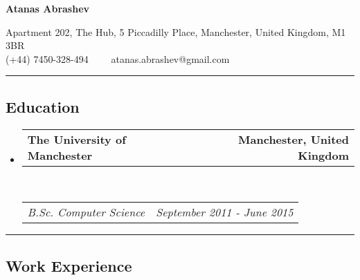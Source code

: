 \documentclass[10pt,letterpaper]{article}
\makeatletter
\newcommand{\headerrow}[2]
{\begin{tabular*}{\linewidth}{l@{\extracolsep{\fill}}r}
    #1 &
    #2 \\
\end{tabular*}}
\makeatother
\begin{document}
\begin{center}
{\LARGE \textbf{Atanas Abrashev}}

Apartment 202, The Hub,
5 Piccadilly Place,
Manchester, United Kingdom,
M1 3BR
\\
(+44) 7450-328-494\ \ \textbullet
\ \ atanas.abrashev@gmail.com
\end{center}

\hrule
\vspace{-0.4em}
\subsection*{Education}

\begin{itemize}
    \parskip=0.1em

    \item
    \headerrow
        {\textbf{The University of Manchester}}
        {\textbf{Manchester, United Kingdom}}
    \\
    \headerrow
        {\emph{B.Sc. Computer Science}}
        {\emph{September 2011 - June 2015}}
\end{itemize}

\hrule
\vspace{-0.4em}
\subsection*{Work Experience}
\end{document}

